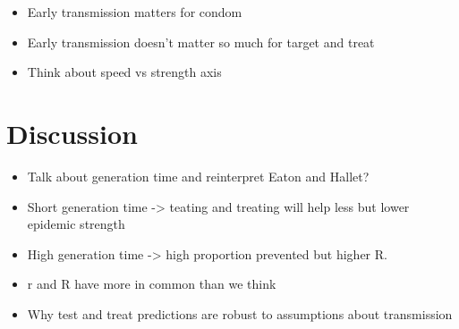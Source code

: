 \documentclass{article}\usepackage[]{graphicx}\usepackage[]{color}
\begin{document}
\begin{itemize}
	\item Early transmission matters for condom
	\item Early transmission doesn't matter so much for target and treat
	\item Think about speed vs strength axis
\end{itemize}

\section{Discussion}


\begin{itemize}
	\item Talk about generation time and reinterpret Eaton and Hallet?
	\item Short generation time -> teating and treating will help less but lower epidemic strength
	\item High generation time -> high proportion prevented but higher R.
\end{itemize}

\begin{itemize}
	\item r and R have more in common than we think
	\item Why test and treat predictions are robust to assumptions about transmission
\end{itemize}
\end{document}
